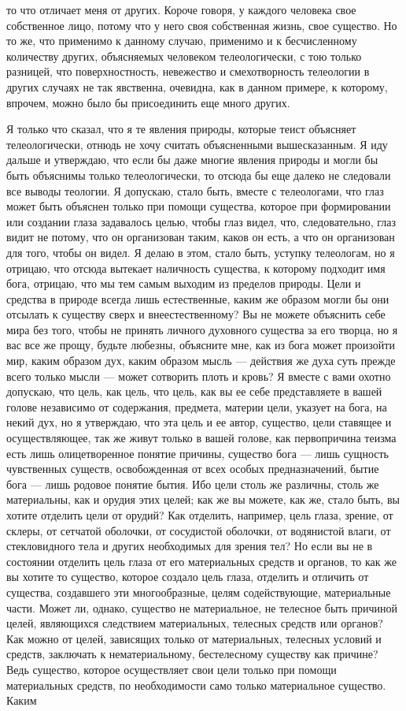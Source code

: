 \documentclass[12pt]{article}
\begin{document}
то что отличает меня от других. Короче говоря, у каждого человека свое собственное лицо, потому что у него своя собственная жизнь, свое существо. Но то же, что применимо к данному случаю, применимо и к бесчисленному количеству других, объясняемых человеком телеологически, с тою только разницей, что поверхностность, невежество и смехотворность телеологии в других случаях не так явственна, очевидна, как в данном примере, к которому, впрочем, можно было бы присоединить еще много других. 

Я только что сказал, что я те явления природы, которые теист объясняет телеологически, отнюдь не хочу считать объясненными вышесказанным. Я иду дальше и утверждаю, что если бы даже многие явления природы и могли бы быть объяснимы только телеологически, то отсюда бы еще далеко не следовали все выводы теологии. Я допускаю, стало быть, вместе с телеологами, что глаз может быть объяснен только при помощи существа, которое при формировании или создании глаза задавалось целью, чтобы глаз видел, что, следовательно, глаз видит не потому, что он организован таким, каков он есть, а что он организован для того, чтобы он видел. Я делаю в этом, стало быть, уступку телеологам, но я отрицаю, что отсюда вытекает наличность существа, к которому подходит имя бога, отрицаю, что мы тем самым выходим из пределов природы. Цели и средства в природе всегда лишь естественные, каким же образом могли бы они отсылать к существу сверх и внеестественному? Вы не можете объяснить себе мира без того, чтобы не принять личного духовного существа за его творца, но я вас все же прощу, будьте любезны, объясните мне, как из бога может произойти мир, каким образом дух, каким образом мысль --- действия же духа суть прежде всего только мысли --- может сотворить плоть и кровь? Я вместе с вами охотно допускаю, что цель, как цель, что цель, как вы ее себе представляете в вашей голове независимо от содержания, предмета, материи цели, указует на бога, на некий дух, но я утверждаю, что эта цель и ее автор, существо, цели ставящее и осуществляющее, так же живут только в вашей голове, как первопричина теизма есть лишь олицетворенное понятие причины, существо бога --- лишь сущность чувственных существ, освобожденная от всех особых предназначений, бытие бога --- лишь родовое понятие бытия. Ибо цели столь же различны, столь же материальны, как и орудия этих целей; как же вы можете, как же, стало быть, вы хотите отделить цели от орудий? Как отделить, например, цель глаза, зрение, от склеры, от сетчатой оболочки, от сосудистой оболочки, от водянистой влаги, от стекловидного тела и других необходимых для зрения тел? Но если вы не в состоянии отделить цель глаза от его материальных средств и органов, то как же вы хотите то существо, которое создало цель глаза, отделить и отличить от существа, создавшего эти многообразные, целям содействующие, материальные части. Может ли, однако, существо не материальное, не телесное быть причиной целей, являющихся следствием материальных, телесных средств или органов? Как можно от целей, зависящих только от материальных, телесных условий и средств, заключать к нематериальному, бестелесному существу как причине? Ведь существо, которое осуществляет свои цели только при помощи материальных средств, по необходимости само только материальное существо. Каким 
\end{document}

